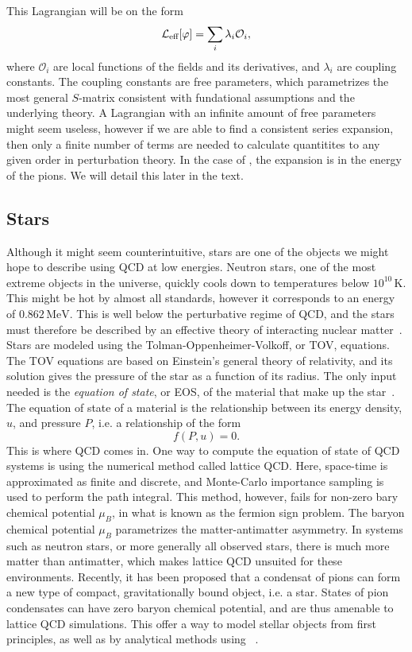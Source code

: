 This Lagrangian will be on the form
\begin{equation}
    \mathcal{L}_\text{eff}[\varphi] = \sum_i \lambda_i \mathcal O_i,
\end{equation}
where $\mathcal O_i$ are local functions of the fields and its derivatives, and $\lambda_i$ are coupling constants.
The coupling constants are free parameters, which parametrizes the most general $S$-matrix consistent with fundational assumptions and the underlying theory.
A Lagrangian with an infinite amount of free parameters might seem useless, however if we are able to find a consistent series expansion, then only a finite number of terms are needed to calculate quantitites to any given order in perturbation theory.
In the case of \chpt, the expansion is in the energy of the pions.
We will detail this later in the text.


\subsection*{Stars}

Although it might seem counterintuitive, stars are one of the objects we might hope to describe using QCD at low energies.
Neutron stars, one of the most extreme objects in the universe, quickly cools down to temperatures below $10^{10} \, \text{K}$.
This might be hot by almost all standards, however it corresponds to an energy of $0.862 \, \text{MeV}$.
This is well below the perturbative regime of QCD, and the stars must therefore be described by an effective theory of interacting nuclear matter~\cite{glendenning:compcat_stars,from_hadrons_to_quarks}.
Stars are modeled using the Tolman-Oppenheimer-Volkoff, or TOV, equations.
The TOV equations are based on Einstein's general theory of relativity, and its solution gives the pressure of the star as a function of its radius.
The only input needed is the \emph{equation of state}, or EOS, of the material that make up the star~\cite{Carroll:spacetime}.
The equation of state of a material is the relationship between its energy density, $u$, and pressure $P$, i.e. a relationship of the form
\begin{equation}
    f(P, u) = 0.
\end{equation}
This is where QCD comes in.
One way to compute the equation of state of QCD systems is using the numerical method called lattice QCD.
Here, space-time is approximated as finite and discrete, and Monte-Carlo importance sampling is used to perform the path integral.
This method, however, fails for non-zero bary chemical potential $\mu_B$, in what is known as the fermion sign problem.
The baryon chemical potential $\mu_B$ parametrizes the matter-antimatter asymmetry.
In systems such as neutron stars, or more generally all observed stars, there is much more matter than antimatter, which makes lattice QCD unsuited for these environments.
Recently, it has been proposed that a condensat of pions can form a new type of compact, gravitationally bound object, i.e. a star.
States of pion condensates can have zero baryon chemical potential, and are thus amenable to lattice QCD simulations.
This offer a way to model stellar objects from first principles, as well as by analytical methods using \chpt~\cite{new_clas_of_compact_stars,andersen:bose_einstein}.

